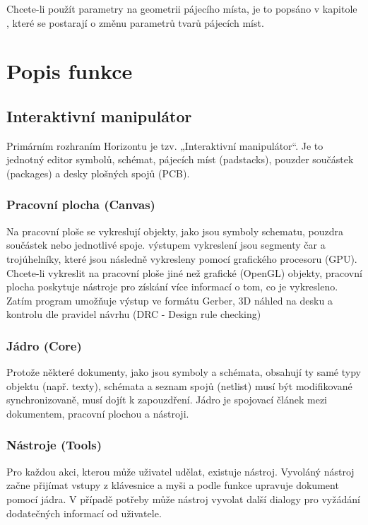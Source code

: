 \documentclass[letterpaper,10pt,czech]{sphinxmanual}
\begin{document}
Chcete-li použít parametry na geometrii pájecího místa, je to popsáno v kapitole {\hyperref[\detokenize{parameter-programs::doc}]{}}, které se postarají o změnu parametrů tvarů pájecích míst.


\chapter{Popis funkce}
\label{\detokenize{theory-of-operation:popis-funkce}}\label{\detokenize{theory-of-operation::doc}}

\section{Interaktivní manipulátor}
\label{\detokenize{theory-of-operation:interaktivni-manipulator}}
Primárním rozhraním Horizontu je tzv. „Interaktivní manipulátor“.
Je to jednotný editor symbolů, schémat, pájecích míst (padstacks),
pouzder součástek (packages) a desky plošných spojů (PCB).


\subsection{Pracovní plocha (Canvas)}
\label{\detokenize{theory-of-operation:pracovni-plocha-canvas}}
Na pracovní ploše se vykreslují objekty, jako jsou symboly schematu, pouzdra součástek nebo jednotlivé spoje.
výstupem vykreslení jsou segmenty čar a trojúhelníky, které jsou následně vykresleny pomocí grafického procesoru (GPU).
Chcete-li vykreslit na pracovní ploše jiné než grafické (OpenGL) objekty,
pracovní plocha poskytuje nástroje pro získání více informací o tom, co je
vykresleno. Zatím program umožňuje výstup ve formátu Gerber, 3D náhled na desku a kontrolu dle pravidel návrhu
(DRC - Design rule checking)


\subsection{Jádro (Core)}
\label{\detokenize{theory-of-operation:jadro-core}}
Protože některé dokumenty, jako jsou symboly a schémata, obsahují ty samé
typy objektu (např. texty), schémata a seznam spojů (netlist) musí být
modifikované synchronizovaně, musí dojít k zapouzdření. Jádro je
spojovací článek mezi dokumentem, pracovní plochou a nástroji.


\subsection{Nástroje (Tools)}
\label{\detokenize{theory-of-operation:nastroje-tools}}
Pro každou akci, kterou může uživatel udělat, existuje nástroj. Vyvoláný nástroj začne
přijímat vstupy z klávesnice a myši a podle funkce upravuje dokument
pomocí jádra. V případě potřeby může nástroj vyvolat další
dialogy pro vyžádání dodatečných informací od uživatele.
\end{document}
